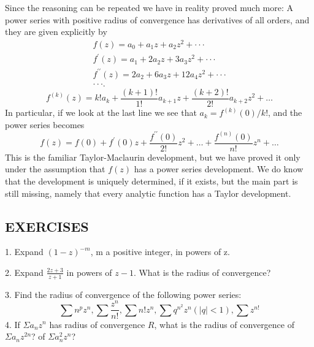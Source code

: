 Since the reasoning can be repeated we have in reality proved much more: A power series with positive radius of convergence has derivatives of all orders, and they are given explicitly by
\begin{equation*}
\begin{array}{l} f (z) = a _ {0} + a _ {1} z + a _ {2} z ^ {2} + \cdot \cdot \cdot \\ f ^ {\prime} (z) = a _ {1} + 2 a _ {2} z + 3 a _ {3} z ^ {2} + \cdot \cdot \cdot \\ f ^ {\prime \prime} (z) = 2 a _ {2} + 6 a _ {3} z + 12 a _ {4} z ^ {2} + \cdot \cdot \cdot \\ \cdot \cdot \cdot . \end{array}
\end{equation*}
\begin{equation*}
f ^ {(k)} (z) = k! a _ {k} + \frac {(k + 1) !}{1 !} a _ {k + 1} z + \frac {(k + 2) !}{2 !} a _ {k + 2} z ^ {2} + \dots
\end{equation*}
In particular, if we look at the last line we see that $a_{k} = f^{(k)}(0) / k!$, and the power series becomes
\begin{equation*}
f (z) = f (0) + f ^ {\prime} (0) z + \frac {f ^ {\prime \prime} (0)}{2 !} z ^ {2} + \dots + \frac {f ^ {(n)} (0)}{n !} z ^ {n} + \dots
\end{equation*}
This is the familiar Taylor-Maclaurin development, but we have proved it only under the assumption that $f(z)$ has a power series development. We do know that the development is uniquely determined, if it exists, but the main part is still missing, namely that every analytic function has a Taylor development.


\subsection*{EXERCISES}
1. Expand $(1 - z)^{-m}$, m a positive integer, in powers of z.

2. Expand $\frac{2z + 3}{z + 1}$ in powers of $z - 1$. What is the radius of convergence?

3. Find the radius of convergence of the following power series:
\begin{equation*}
\sum n ^ {p} z ^ {n}, \sum \frac {z ^ {n}}{n !}, \sum n! z ^ {n}, \sum q ^ {n ^ {2}} z ^ {n} (| q | <   1), \sum z ^ {n!}
\end{equation*}
4. If $\Sigma a_{n}z^{n}$ has radius of convergence $R$, what is the radius of convergence of $\Sigma a_{n}z^{2n}$? of $\Sigma a_{n}^{2}z^{n}$?

